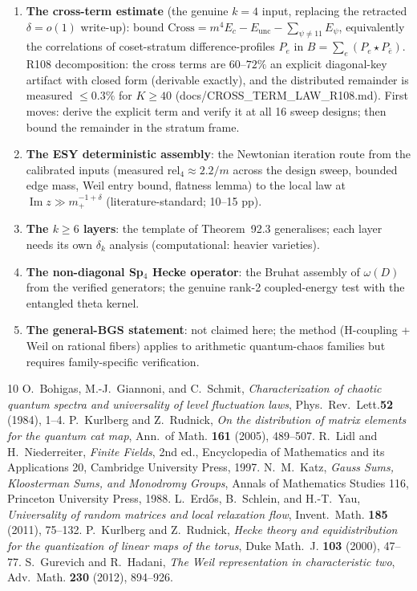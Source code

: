 \documentclass[11pt]{article}
\begin{document}
\begin{enumerate}
\item \textbf{The cross-term estimate} (the genuine $k{=}4$ input,
replacing the retracted $\delta = o(1)$ write-up): bound
$\mathrm{Cross} = m^4 E_c - E_{\mathrm{unc}} - \sum_{\psi \ne 11}
E_\psi$, equivalently the correlations of coset-stratum
difference-profiles $P_e$ in $B = \sum_e (P_e \star P_{\bar e})$.
R108 decomposition: the cross terms are $60$--$72\%$ an explicit
diagonal-key artifact with closed form (derivable exactly), and the
distributed remainder is measured $\le 0.3\%$ for $K \ge 40$
(docs/CROSS\_TERM\_LAW\_R108.md).  First moves: derive the explicit
term and verify it at all 16 sweep designs; then bound the remainder
in the stratum frame.
\item \textbf{The ESY deterministic assembly}: the Newtonian
iteration route from the calibrated inputs (measured rel$_4 \approx
2.2/m$ across the design sweep, bounded edge mass, Weil entry bound,
flatness lemma) to
the local law at $\operatorname{Im} z \gg m_+^{-1+\delta}$
(literature-standard; 10--15 pp).
\item \textbf{The $k \ge 6$ layers}: the template of
Theorem~92.3 generalises; each layer needs its own
$\delta_k$ analysis (computational: heavier varieties).
\item \textbf{The non-diagonal Sp$_4$ Hecke operator}: the Bruhat
assembly of $\omega(D)$ from the verified generators; the genuine
rank-2 coupled-energy test with the entangled theta kernel.
\item \textbf{The general-BGS statement}: not claimed here; the
method (H-coupling + Weil on rational fibers) applies to arithmetic
quantum-chaos families but requires family-specific verification.
\end{enumerate}

\begin{thebibliography}{10}
 O.~Bohigas, M.-J.~Giannoni, and C.~Schmit,
\emph{Characterization of chaotic quantum spectra and universality of
level fluctuation laws}, Phys.~Rev.~Lett.\textbf{52} (1984), 1--4.
 P.~Kurlberg and Z.~Rudnick, \emph{On the distribution
of matrix elements for the quantum cat map}, Ann.~of Math.
\textbf{161} (2005), 489--507.
 R.~Lidl and H.~Niederreiter, \emph{Finite Fields},
2nd ed., Encyclopedia of Mathematics and its Applications 20,
Cambridge University Press, 1997.
 N.~M.~Katz, \emph{Gauss Sums, Kloosterman Sums, and
Monodromy Groups}, Annals of Mathematics Studies 116, Princeton
University Press, 1988.
 L.~Erd\H{o}s, B.~Schlein, and H.-T.~Yau,
\emph{Universality of random matrices and local relaxation flow},
Invent.~Math. \textbf{185} (2011), 75--132.
 P.~Kurlberg and Z.~Rudnick, \emph{Hecke theory and
equidistribution for the quantization of linear maps of the torus},
Duke Math.~J. \textbf{103} (2000), 47--77.
 S.~Gurevich and R.~Hadani, \emph{The Weil
representation in characteristic two}, Adv.~Math. \textbf{230}
(2012), 894--926.
\end{thebibliography}
\end{document}
